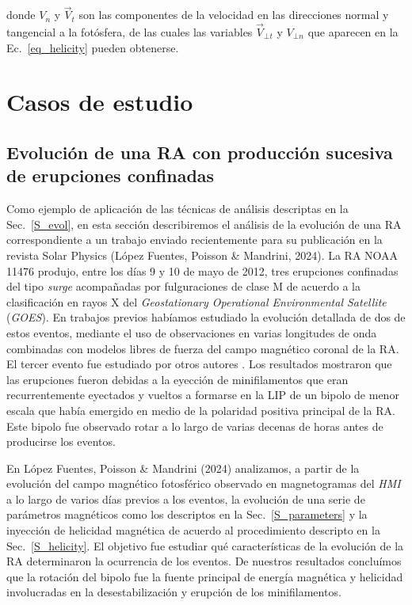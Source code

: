 \documentclass[baaa]{baaa}
\begin{document}
\noindent donde $V_n$ y $\vec{V}_t$ son las componentes de la velocidad en las direcciones normal y tangencial a la fotósfera, de las cuales las variables $\vec{V}_{\bot t}$ y $V_{\bot n}$ que aparecen en la Ec.~\ref{eq_helicity} pueden obtenerse.

\section{Casos de estudio}
\label{S_examples}

\subsection{Evolución de una RA con producción sucesiva de erupciones confinadas}

Como ejemplo de aplicación de las técnicas de análisis descriptas en la Sec.~\ref{S_evol}, en esta sección describiremos el análisis de la evolución de una RA correspondiente a un trabajo enviado recientemente para su publicación en la revista Solar Physics (López Fuentes, Poisson \& Mandrini, 2024). La RA NOAA 11476 produjo, entre los días 9 y 10 de mayo de 2012, tres erupciones confinadas del tipo {\sl surge} acompañadas por fulguraciones de clase M de acuerdo a la clasificación en rayos X del {\sl Geostationary Operational Environmental Satellite} ({\sl GOES}). En trabajos previos \citep{lopezfuentes2018,poisson2020b} habíamos estudiado la evolución detallada de dos de estos eventos, mediante el uso de observaciones en varias longitudes de onda combinadas con modelos libres de fuerza del campo magnético coronal de la RA. El tercer evento fue estudiado por otros autores \citep{yang2018}. Los resultados mostraron que las erupciones fueron debidas a la eyección de minifilamentos que eran recurrentemente eyectados y vueltos a formarse en la LIP de un bipolo de menor escala que había emergido en medio de la polaridad positiva principal de la RA. Este bipolo fue observado rotar a lo largo de varias decenas de horas antes de producirse los eventos. 

En López Fuentes, Poisson \& Mandrini (2024) analizamos, a partir de la evolución del campo magnético fotosférico observado en magnetogramas del {\sl HMI} a lo largo de varios días previos a los eventos, la evolución de una serie de parámetros magnéticos como los descriptos en la Sec.~\ref{S_parameters} y la inyección de helicidad magnética de acuerdo al procedimiento descripto en la Sec.~\ref{S_helicity}. El objetivo fue estudiar qué características de la evolución de la RA determinaron la ocurrencia de los eventos. De nuestros resultados concluímos que la rotación del bipolo fue la fuente principal de energía magnética y helicidad involucradas en la desestabilización y erupción de los minifilamentos.
\end{document}

